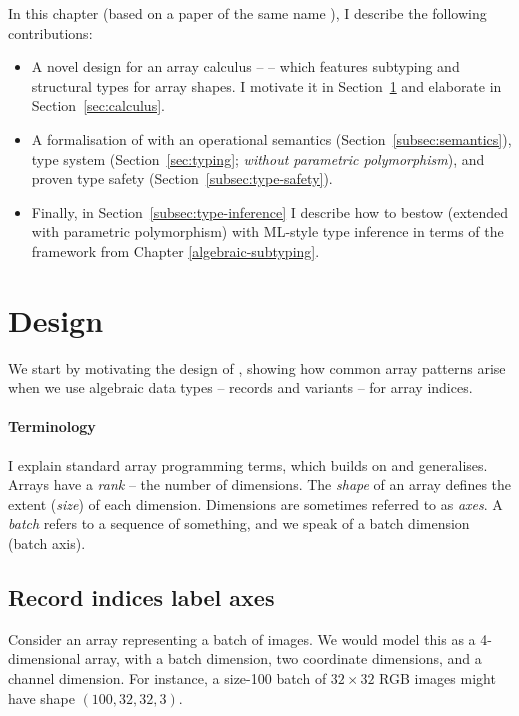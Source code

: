 In this chapter (based on a paper of the same name \cite{star}), I describe the following contributions: \begin{itemize}
    \item A novel design for an array calculus – \starr{} – which features subtyping and structural types for array shapes. I motivate it in Section~\ref{sec:design} and elaborate in Section~\ref{sec:calculus}.
    \item A formalisation of with an operational semantics (Section~\ref{subsec:semantics}), type system (Section~\ref{sec:typing};  \emph{without parametric polymorphism}), and proven type safety (Section~\ref{subsec:type-safety}).
    \item Finally, in Section~\ref{subsec:type-inference} I describe how to bestow \starr{} (extended with parametric polymorphism) with ML-style type inference in terms of the \inference{} framework from Chapter \ref{algebraic-subtyping}.
\end{itemize}

\section{Design}
\label{sec:design}

We start by motivating the design of \starr{}, showing how common array patterns arise when we use algebraic data types -- records and variants -- for array indices.

\paragraph{Terminology} I explain standard array programming terms, which \starr{} builds on and generalises. Arrays have a \emph{rank} -- the number of dimensions. The \emph{shape} of an array defines the extent (\emph{size}) of
each dimension. Dimensions are sometimes referred to as \emph{axes}.
A \emph{batch} refers to a sequence of something, and we speak of a batch dimension (batch axis).

\subsection{Record indices label axes}

Consider an array representing a batch of images. We would model this as a 4-dimensional array, with a batch dimension, two coordinate dimensions, and a channel dimension. For instance, a size-100 batch of $32 \times 32$ RGB images might have shape $(100, 32, 32, 3)$.

